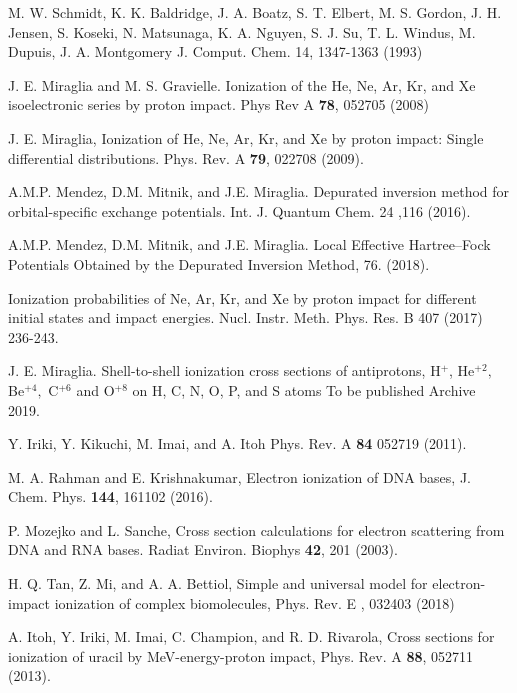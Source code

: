 \documentclass[preprint,12pt]{article}
\begin{document}
\begin{thebibliography}{99}

M. W. Schmidt, K. K. Baldridge, J. A. Boatz, S. T. Elbert, M. S. Gordon, 
J. H. Jensen, S. Koseki, N. Matsunaga, K. A. Nguyen, S. J. Su, T. L. Windus, 
M. Dupuis, J. A. Montgomery 
J. Comput. Chem. 14, 1347-1363 (1993)

J. E. Miraglia and M. S. Gravielle. Ionization of the
He, Ne, Ar, Kr, and Xe isoelectronic series by proton impact. 
Phys Rev A \textbf{78}, 052705 (2008)

J. E. Miraglia, Ionization of He, Ne, Ar, Kr, and Xe
by proton impact: Single differential distributions. 
Phys. Rev. A \textbf{79}, 022708 (2009).

A.M.P. Mendez, D.M. Mitnik, and J.E. Miraglia.
Depurated inversion method for orbital-specific exchange potentials. 
Int. J. Quantum Chem. 24 ,116 (2016).

A.M.P. Mendez, D.M. Mitnik, and J.E. Miraglia. Local Effective 
Hartree--Fock Potentials Obtained by the Depurated Inversion Method,
76. (2018).

Ionization probabilities of Ne, Ar, Kr, and Xe by
proton impact for different initial states and impact energies. 
Nucl. Instr. Meth. Phys. Res. B 407 (2017) 236-243.

J. E. Miraglia. Shell-to-shell ionization cross
sections of antiprotons, H$^{+}$, He$^{+2},$ Be$^{+4},$ C$^{+6}$ and 
O$^{+8}$ on H, C, N, O, P, and S atoms To be published Archive 2019.

Y. Iriki, Y. Kikuchi, M. Imai, and A. Itoh
Phys. Rev. A \textbf{84} 052719 (2011).

M. A. Rahman and E. Krishnakumar,
Electron ionization of DNA bases,
J. Chem. Phys. \textbf{144}, 161102 (2016).

P. Mozejko and L. Sanche, 
Cross section calculations for electron scattering from DNA and RNA bases.
Radiat Environ. Biophys \textbf{42}, 201 (2003).

H. Q. Tan, Z. Mi, and A. A. Bettiol, 
Simple and universal model for electron-impact ionization of complex biomolecules, 
Phys. Rev. E , 032403 (2018)

A. Itoh, Y. Iriki, M. Imai, C. Champion, and R. D. Rivarola, 
Cross sections for ionization of uracil by MeV-energy-proton impact, 
Phys. Rev. A \textbf{88}, 052711 (2013).


\end{thebibliography}
\end{document}

